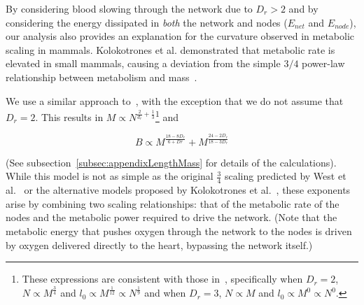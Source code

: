 \documentclass[12pt]{article}
\begin{document}
By considering blood slowing through the network due to $D_r > 2$ and by considering the energy dissipated in \emph{both} the network and 
nodes ($E_{net}$ and $E_{node}$), our analysis also provides an explanation for the curvature observed in
metabolic scaling in mammals. Kolokotrones et al.
demonstrated that metabolic rate is elevated in small mammals, causing a
deviation from the simple $3/4$ power-law relationship between metabolism and
mass~\cite{kolokotrones2010curvature}. 

We use a similar approach to~\cite{banavar10}, with the exception that we do
not
assume that $D_r=2$. This results in $M \propto N^{\frac{2}{d_r} +
\frac{1}{3}}$\footnote{These expressions are consistent with those
in~\cite{banavar10}, specifically when $D_r=2$, $N\propto M^{\frac{3}{4}}$ and
$l_0 \propto M^{\frac{1}{12}}\propto N^{\frac{1}{9}}$ and when $D_r=3$, $N\propto M$ and $l_0\propto M^0 \propto N^0$.} and

\begin{equation}
  \label{eq:OrganismPower}
  B \propto M^{\frac{18-8D_r}{6+Dr}} + M^{\frac{24-2D_r}{18-3D_r}} 
\end{equation}

\noindent (See subsection~\ref{subsec:appendixLengthMass} for details of the calculations).
While this model is not as simple as the original $\frac{3}{4}$
scaling predicted by West et al.~\cite{west97} or the alternative models
proposed by Kolokotrones et al.~\cite{kolokotrones2010curvature}, these exponents arise by combining two scaling relationships: that of the metabolic rate of the nodes and the metabolic power required to drive the network. (Note that the metabolic energy that pushes oxygen through the network to the nodes is driven by oxygen delivered directly to the heart, bypassing the network itself.)

\end{document}
